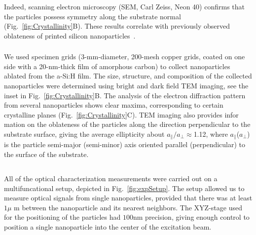         \subsubsection{}
                Indeed, scanning electron microscopy (SEM, Carl Zeiss, Neon 40) confirms that the particles possess 
            symmetry along the substrate normal (Fig.~\ref{fig:Crystallinity}B). These results correlate with previously observed
            oblateness of printed silicon nanoparticles~\cite{zywietz2014laser}.

        \subsubsection{}
                We used specimen grids (3-mm-diameter, 200-mesh copper grids, coated on one side with a 20-nm-thick film
            of amorphous carbon) to collect nanoparticles ablated from the a-Si:H film. The size, structure, and composition
            of the collected nanoparticles were determined using bright and dark field TEM imaging, see the inset in
            Fig.~\ref{fig:Crystallinity}B. The analysis of the electron diffraction pattern from several nanoparticles shows clear maxima,
            corresponding to certain crystalline planes (Fig.~\ref{fig:Crystallinity}C).  TEM imaging also provides infor
            mation on the oblateness of the particles along the direction perpendicular to the substrate surface, giving
            the average ellipticity about $a_{\parallel}/a_{\perp}\approx$1.12, where $a_{\parallel}$($a_{\perp}$) is
            the particle semi-major (semi-minor) axis oriented parallel (perpendicular) to the surface of the substrate.

        \subsubsection{}



    \subsection{}
            All of the optical characterization measurements were carried out on a multifuncational setup, depicted in
            Fig.~\ref{fig:expSetup}. The setup allowed us to measure optical signals from single nanoparticles, provided that
            there was at least $1\mu$ m between the nanoparticle and its nearest neighbors. The XYZ-stage used for the
            positioning of the particles had $100$nm precision, giving enough control to position a single nanoparticle into
            the center of the excitation beam.

